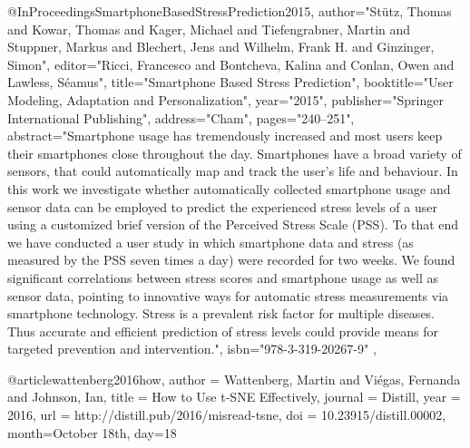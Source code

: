 @InProceedings{SmartphoneBasedStressPrediction2015,
  author="St{\"u}tz, Thomas
  and Kowar, Thomas
  and Kager, Michael
  and Tiefengrabner, Martin
  and Stuppner, Markus
  and Blechert, Jens
  and Wilhelm, Frank H.
  and Ginzinger, Simon",
  editor="Ricci, Francesco
  and Bontcheva, Kalina
  and Conlan, Owen
  and Lawless, S{\'e}amus",
  title="Smartphone Based Stress Prediction",
  booktitle="User Modeling, Adaptation and Personalization",
  year="2015",
  publisher="Springer International Publishing",
  address="Cham",
  pages="240--251",
  abstract="Smartphone usage has tremendously increased and most users keep their smartphones close throughout the day. Smartphones have a broad variety of sensors, that could automatically map and track the user's life and behaviour. In this work we investigate whether automatically collected smartphone usage and sensor data can be employed to predict the experienced stress levels of a user using a customized brief version of the Perceived Stress Scale (PSS). To that end we have conducted a user study in which smartphone data and stress (as measured by the PSS seven times a day) were recorded for two weeks. We found significant correlations between stress scores and smartphone usage as well as sensor data, pointing to innovative ways for automatic stress measurements via smartphone technology. Stress is a prevalent risk factor for multiple diseases. Thus accurate and efficient prediction of stress levels could provide means for targeted prevention and intervention.",
  isbn="978-3-319-20267-9"
},

@article{wattenberg2016how,
  author = {Wattenberg, Martin and Viégas, Fernanda and Johnson, Ian},
  title = {How to Use t-SNE Effectively},
  journal = {Distill},
  year = {2016},
  url = {http://distill.pub/2016/misread-tsne},
  doi = {10.23915/distill.00002},
  month={October 18th},
  day={18}
}



